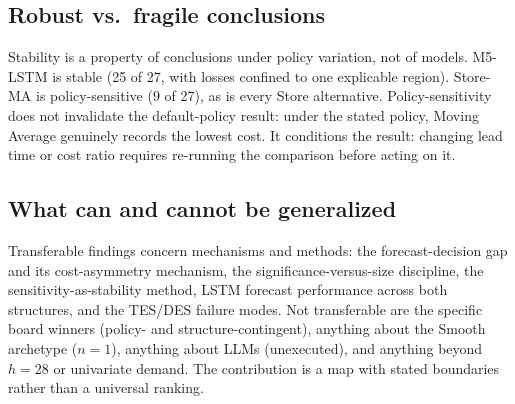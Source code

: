 \subsection{Robust vs.\ fragile conclusions}
\label{sec:d-robust}
Stability is a property of conclusions under policy variation, not of
models. M5-LSTM is stable (25 of 27, with losses confined to one explicable
region). Store-MA is policy-sensitive (9 of 27), as is every Store
alternative. Policy-sensitivity does not invalidate the default-policy
result: under the stated policy, Moving Average genuinely records the lowest
cost. It conditions the result: changing lead time or cost ratio requires
re-running the comparison before acting on it.

\subsection{What can and cannot be generalized}
\label{sec:d-general}
Transferable findings concern mechanisms and methods: the forecast-decision
gap and its cost-asymmetry mechanism, the significance-versus-size
discipline, the sensitivity-as-stability method, LSTM forecast performance
across both structures, and the TES/DES failure modes. Not transferable are
the specific board winners (policy- and structure-contingent), anything about
the Smooth archetype ($n=1$), anything about LLMs (unexecuted), and anything
beyond $h=28$ or univariate demand. The contribution is a map with stated
boundaries rather than a universal ranking.
